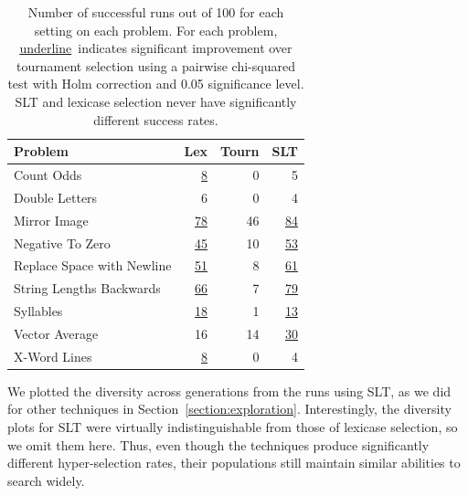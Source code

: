 \documentclass{sig-alternate}
\begin{document}
\begin{table}[t]
\centering
\caption{Number of successful runs out of 100 for each setting on each problem. For each problem, \underline{underline}~indicates significant improvement over tournament selection using a pairwise chi-squared test with Holm correction and 0.05 significance level. SLT and lexicase selection never have significantly different success rates.}
\label{table:slt-results}
\begin{tabular}{lrrr}
\toprule
\textbf{Problem}                    & \textbf{Lex} & \textbf{Tourn} & \textbf{SLT} \\
\midrule
Count Odds                 & \underline{8}        & 0          & 5   \\
Double Letters             & 6        & 0          & 4   \\
Mirror Image               & \underline{78}       & 46         & \underline{84}  \\
Negative To Zero           & \underline{45}       & 10         & \underline{53}  \\
Replace Space with Newline & \underline{51}       & 8          & \underline{61}  \\
String Lengths Backwards   & \underline{66}       & 7          & \underline{79}  \\
Syllables                  & \underline{18}       & 1          & \underline{13}  \\
Vector Average             & 16       & 14         & \underline{30}  \\
X-Word Lines               & \underline{8}        & 0          & 4   \\
\bottomrule
\end{tabular}
\end{table}

We plotted the diversity across generations from the runs using SLT, as we did for other techniques in Section~\ref{section:exploration}. Interestingly, the diversity plots for SLT were virtually indistinguishable from those of lexicase selection, so we omit them here. Thus, even though the techniques produce significantly different hyper-selection rates, their populations still maintain similar abilities to search widely.
\end{document}
